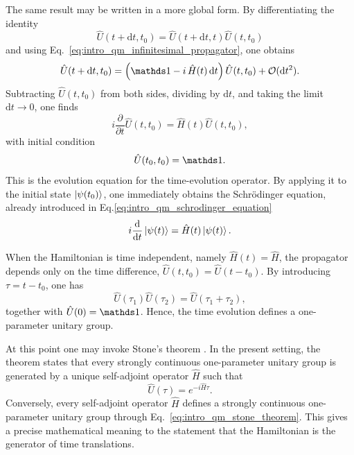 The same result may be written in a more global form. By differentiating the identity
\begin{equation}
	\hat U(t+\mathrm{d}t,t_0)=\hat U(t+\mathrm{d}t,t)\hat U(t,t_0)
	\label{eq:intro_qm_propagator_composition_infinitesimal}
\end{equation}
and using Eq.~\eqref{eq:intro_qm_infinitesimal_propagator}, one obtains
\begin{equation}
	\hat U(t+\mathrm{d}t,t_0)
	=
	\left(\id-i\,\hat H(t)\,\mathrm{d}t\right)\hat U(t,t_0)+\mathcal{O}(\mathrm{d}t^2).
	\label{eq:intro_qm_propagator_expansion_differential}
\end{equation}
Subtracting $\hat U(t,t_0)$ from both sides, dividing by $\mathrm{d}t$, and taking the limit $\mathrm{d}t\to 0$, one finds
\begin{equation}
	i\frac{\partial}{\partial t}\hat U(t,t_0)=\hat H(t)\hat U(t,t_0),
	\label{eq:intro_qm_schrodinger_equation_propagator}
\end{equation}
with initial condition
\begin{equation}
	\hat U(t_0,t_0)=\id.
	\label{eq:intro_qm_initial_condition_propagator}
\end{equation}
This is the evolution equation for the time-evolution operator. By applying it to the initial state $\ket{\psi(t_0)}$, one immediately obtains the Schrödinger equation, already introduced in Eq.\eqref{eq:intro_qm_schrodinger_equation}
\begin{equation}
	i\frac{\mathrm{d}}{\mathrm{d}t}\ket{\psi(t)}=\hat H(t)\ket{\psi(t)}.
	\label{eq:intro_qm_schrodinger_equation_state}
\end{equation}

When the Hamiltonian is time independent, namely $\hat H(t)=\hat H$, the propagator depends only on the time difference, $\hat U(t,t_0)=\hat U(t-t_0)$. By introducing $\tau=t-t_0$, one has
\begin{equation}
	\hat U(\tau_1)\hat U(\tau_2)=\hat U(\tau_1+\tau_2),
	\label{eq:intro_qm_one_parameter_unitary_group}
\end{equation}
together with $\hat U(0)=\id$. Hence, the time evolution defines a one-parameter unitary group.

At this point one may invoke Stone's theorem \cite{Stone32}. In the present setting, the theorem states that every strongly continuous one-parameter unitary group is generated by a unique self-adjoint operator $\hat H$ such that
\begin{equation}
	\hat U(\tau)=e^{-i\hat H\tau}.
	\label{eq:intro_qm_stone_theorem}
\end{equation}
Conversely, every self-adjoint operator $\hat H$ defines a strongly continuous one-parameter unitary group through Eq.~\eqref{eq:intro_qm_stone_theorem}. This gives a precise mathematical meaning to the statement that the Hamiltonian is the generator of time translations.

